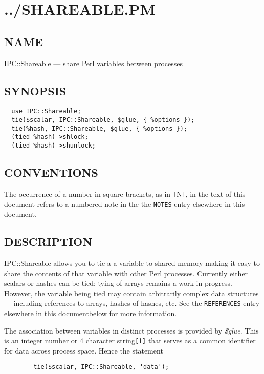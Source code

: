 
\section{../SHAREABLE.PM}%

\subsection*{NAME}
IPC::Shareable --- share Perl variables between processes

\subsection*{SYNOPSIS}\begin{verbatim}
  use IPC::Shareable;
  tie($scalar, IPC::Shareable, $glue, { %options });
  tie(%hash, IPC::Shareable, $glue, { %options });
  (tied %hash)->shlock;
  (tied %hash)->shunlock;
\end{verbatim}

\subsection*{CONVENTIONS}%

The occurrence of a number in square brackets, as in {\tt [}N{\tt ]}, in the text
of this document refers to a numbered note in the the {\tt NOTES} entry elsewhere in this document.

\subsection*{DESCRIPTION}
IPC::Shareable allows you to tie a a variable to shared memory making
it easy to share the contents of that variable with other Perl
processes.  Currently either scalars or hashes can be tied; tying of
arrays remains a work in progress.  However, the variable being tied
may contain arbitrarily complex data structures --- including references
to arrays, hashes of hashes, etc.  See the {\tt REFERENCES} entry elsewhere in this documentbelow for
more information.

The association between variables in distinct processes is provided by
{\em \$glue\/}.  This is an integer number or 4 character string{\tt [}1{\tt ]} that serves
as a common identifier for data across process space.  Hence the
statement
\begin{verbatim}
        tie($scalar, IPC::Shareable, 'data');
\end{verbatim}

